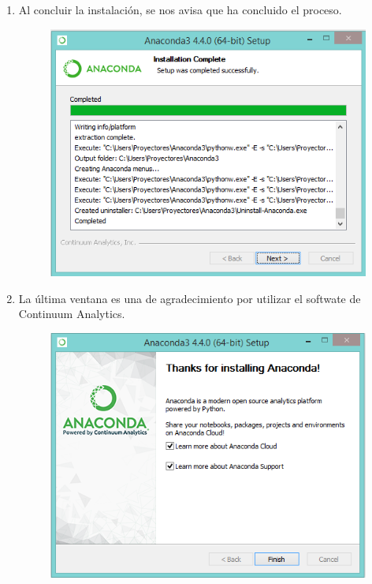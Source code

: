 \documentclass[12pt]{article}
\begin{document}
\begin{enumerate}
\begin{figure}[H]
\end{figure}
\item Al concluir la instalación, se nos avisa que ha concluido el proceso.
\begin{figure}[H]
	\centering
	\includegraphics[scale=0.5]{Imagenes/Instalacion_Anaconda_Windows_09} 
\end{figure}
\item La última ventana es una de agradecimiento por utilizar el softwate de Continuum Analytics.
\begin{figure}[H]
	\centering
	\includegraphics[scale=0.5]{Imagenes/Instalacion_Anaconda_Windows_10} 
\end{figure}

\end{enumerate}
\end{document}
